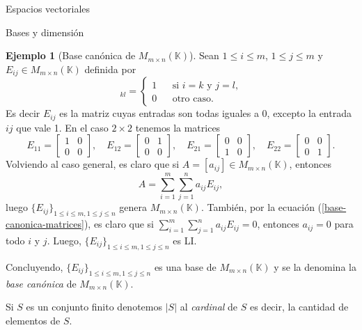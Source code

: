 \documentclass[a4paper,12pt,twoside,spanish,reqno]{amsbook}
\theoremstyle{definition}
\newtheorem{ejemplo}{Ejemplo}[section]
\theoremstyle{remark}
\newcommand{\K}{\mathbb K}
\begin{document}
\begin{chapter}{Espacios vectoriales}
\begin{section}{Bases y dimensión}
\begin{ejemplo}[{\sc Base canónica de $M_{m \times n}(\K)$}] 
    Sean $1 \le i \le m$, $1\le j \le m$ y $E_{ij} \in M_{m \times n}(\K)$ definida por
    \begin{equation*}
        [E_{ij}]_{kl} = \left\{ 
        \begin{array}{lll}
        1& &\text{si $i=k$ y $j=l$,} \\
        0& &\text{otro caso}. 
        \end{array}
         \right.
    \end{equation*}
    Es decir $E_{ij}$  es la matriz cuyas entradas son todas iguales a 0,  excepto la entrada $ij$ que vale 1. En el caso $2 \times 2$  tenemos la matrices
    \begin{equation*}
        E_{11} = \begin{bmatrix} 1&0\\0&0\end{bmatrix}, \quad
        E_{12} = \begin{bmatrix} 0&1\\0&0\end{bmatrix}, \quad
        E_{21} = \begin{bmatrix} 0&0\\1&0\end{bmatrix}, \quad
        E_{22} = \begin{bmatrix} 0&0\\0&1\end{bmatrix}.
    \end{equation*}
    Volviendo al caso general,  es claro que si $A= [a_{ij}] \in M_{m \times n}(\K)$,  entonces
    \begin{equation}\label{base-canonica-matrices}
        A = \sum_{i=1}^{m} \sum_{j=1}^{n} a_{ij}E_{ij},
    \end{equation}
    luego $\{E_{ij} \}_{1 \le i \le m, 1\le j \le n}$ genera $M_{m \times n}(\K)$. También, por la ecuación (\ref{base-canonica-matrices}), es claro que si $\sum_{i=1}^{m} \sum_{j=1}^{n} a_{ij}E_{ij}=0$,  entonces $a_{ij}=0$ para todo $i$ y $j$. Luego,  $\{E_{ij} \}_{1 \le i \le m, 1\le j \le n}$ es LI. 
    
    Concluyendo,  $\{E_{ij} \}_{1 \le i \le m, 1\le j \le n}$ es una base de  $M_{m \times n}(\K)$ y se la denomina la \textit{base canónica} de  $M_{m \times n}(\K)$.
\end{ejemplo}



Si $S$ es un conjunto finito denotemos $|S|$  al \textit{cardinal} de  $S$ es decir, la cantidad de elementos de $S$. 


\end{section}
\end{chapter}
\end{document}
